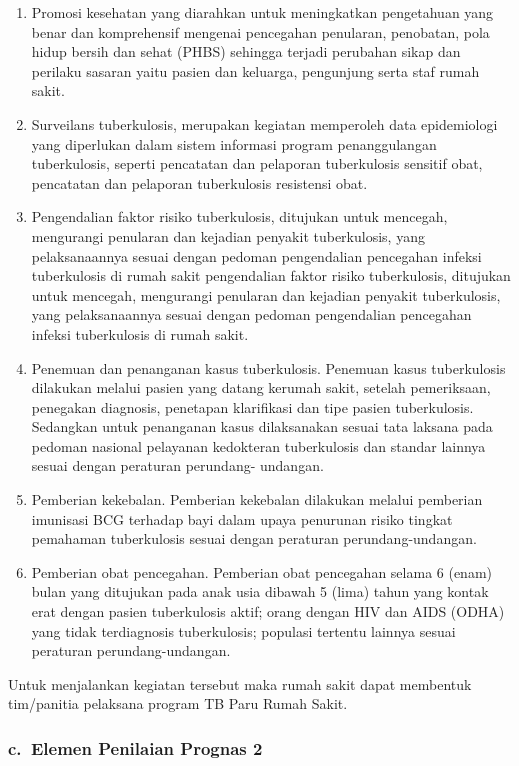 \documentclass[
]{book}
\providecommand{\tightlist}{%
  \setlength{\itemsep}{0pt}\setlength{\parskip}{0pt}}
\begin{document}
\begin{enumerate}
\def\labelenumi{\arabic{enumi}.}
\tightlist
\item
  Promosi kesehatan yang diarahkan untuk meningkatkan pengetahuan yang benar dan komprehensif mengenai pencegahan penularan, penobatan, pola hidup bersih dan sehat (PHBS) sehingga terjadi perubahan sikap dan perilaku sasaran yaitu pasien dan keluarga, pengunjung serta staf rumah sakit.
\item
  Surveilans tuberkulosis, merupakan kegiatan memperoleh data epidemiologi yang diperlukan dalam sistem informasi program penanggulangan tuberkulosis, seperti pencatatan dan pelaporan tuberkulosis sensitif obat, pencatatan dan pelaporan tuberkulosis resistensi obat.
\item
  Pengendalian faktor risiko tuberkulosis, ditujukan untuk mencegah, mengurangi penularan dan kejadian penyakit tuberkulosis, yang pelaksanaannya sesuai dengan pedoman pengendalian pencegahan infeksi tuberkulosis di rumah sakit pengendalian faktor risiko tuberkulosis, ditujukan untuk mencegah, mengurangi penularan dan kejadian penyakit tuberkulosis, yang pelaksanaannya sesuai dengan pedoman pengendalian pencegahan infeksi tuberkulosis di rumah sakit.
\item
  Penemuan dan penanganan kasus tuberkulosis.
  Penemuan kasus tuberkulosis dilakukan melalui pasien yang datang kerumah sakit, setelah pemeriksaan, penegakan diagnosis, penetapan klarifikasi dan tipe pasien tuberkulosis. Sedangkan untuk penanganan kasus dilaksanakan sesuai tata laksana pada pedoman nasional pelayanan kedokteran tuberkulosis dan standar lainnya sesuai dengan peraturan perundang- undangan.
\item
  Pemberian kekebalan.
  Pemberian kekebalan dilakukan melalui pemberian imunisasi BCG terhadap bayi dalam upaya penurunan risiko tingkat pemahaman tuberkulosis sesuai dengan peraturan perundang-undangan.
\item
  Pemberian obat pencegahan.
  Pemberian obat pencegahan selama 6 (enam) bulan yang ditujukan pada anak usia dibawah 5 (lima) tahun yang kontak erat dengan pasien tuberkulosis aktif; orang dengan HIV dan AIDS (ODHA) yang tidak terdiagnosis tuberkulosis; populasi tertentu lainnya sesuai peraturan perundang-undangan.
\end{enumerate}

Untuk menjalankan kegiatan tersebut maka rumah sakit dapat membentuk tim/panitia pelaksana program TB Paru Rumah Sakit.

\hypertarget{c.-elemen-penilaian-prognas-2}{%
\subsubsection*{c.~Elemen Penilaian Prognas 2}\label{c.-elemen-penilaian-prognas-2}}
\end{document}
